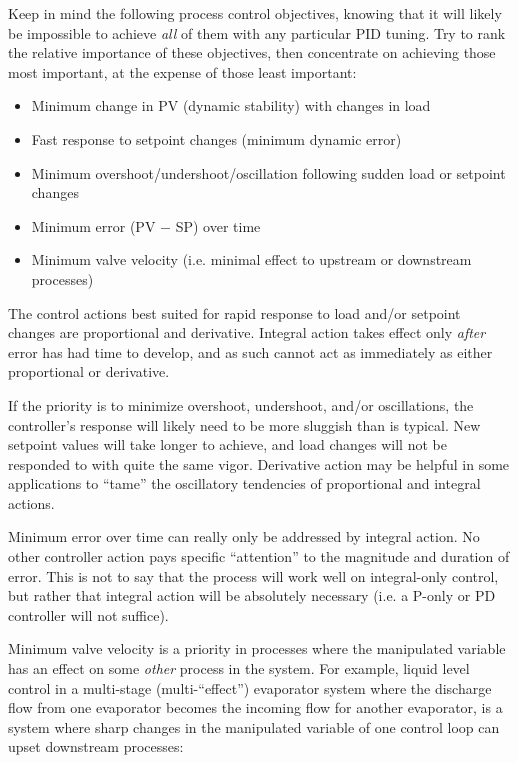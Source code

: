 Keep in mind the following process control objectives, knowing that it will likely be impossible to achieve \textit{all} of them with any particular PID tuning.  Try to rank the relative importance of these objectives, then concentrate on achieving those most important, at the expense of those least important:

\begin{itemize}
\item Minimum change in PV (dynamic stability) with changes in load 
\item Fast response to setpoint changes (minimum dynamic error)
\item Minimum overshoot/undershoot/oscillation following sudden load or setpoint changes
\item Minimum error (PV $-$ SP) over time
\item Minimum valve velocity (i.e. minimal effect to upstream or downstream processes)
\end{itemize}

The control actions best suited for rapid response to load and/or setpoint changes are proportional and derivative.  Integral action takes effect only \textit{after} error has had time to develop, and as such cannot act as immediately as either proportional or derivative.

If the priority is to minimize overshoot, undershoot, and/or oscillations, the controller's response will likely need to be more sluggish than is typical.  New setpoint values will take longer to achieve, and load changes will not be responded to with quite the same vigor.  Derivative action may be helpful in some applications to ``tame'' the oscillatory tendencies of proportional and integral actions.

Minimum error over time can really only be addressed by integral action.  No other controller action pays specific ``attention'' to the magnitude and duration of error.  This is not to say that the process will work well on integral-only control, but rather that integral action will be absolutely necessary (i.e. a P-only or PD controller will not suffice).

\filbreak

Minimum valve velocity is a priority in processes where the manipulated variable has an effect on some \textit{other} process in the system.  For example, liquid level control in a multi-stage (multi-``effect'') evaporator system where the discharge flow from one evaporator becomes the incoming flow for another evaporator, is a system where sharp changes in the manipulated variable of one control loop can upset downstream processes:

